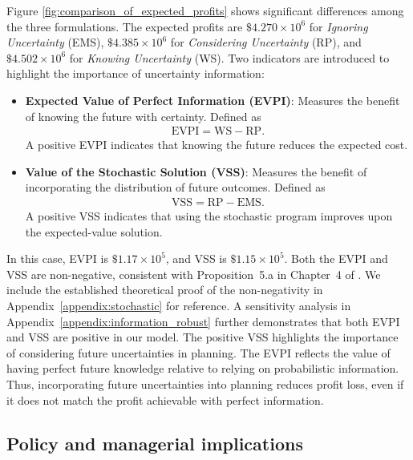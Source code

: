 \documentclass[11pt,english]{article}
\begin{document}
Figure \ref{fig:comparison_of_expected_profits} shows significant differences among the three formulations. The expected profits are $\$4.270 \times 10^6$ for \textit{Ignoring Uncertainty} (EMS), $\$4.385 \times 10^6$ for \textit{Considering Uncertainty} (RP), and $\$4.502 \times 10^6$ for \textit{Knowing Uncertainty} (WS). Two indicators are introduced to highlight the importance of uncertainty information:

\begin{itemize}
    \item \textbf{Expected Value of Perfect Information (EVPI)}: Measures the benefit of knowing the future with certainty. Defined as
    \begin{align}
        \text{EVPI} = \text{WS} - \text{RP}.
    \end{align}
    A positive EVPI indicates that knowing the future reduces the expected cost.

    \item \textbf{Value of the Stochastic Solution (VSS)}: Measures the benefit of incorporating the distribution of future outcomes. Defined as
    \begin{align}
        \text{VSS} = \text{RP} - \text{EMS}.
    \end{align}
    A positive VSS indicates that using the stochastic program improves upon the expected-value solution.
\end{itemize}

In this case, EVPI is $\$1.17 \times 10^5$, and VSS is $\$1.15 \times 10^5$. Both the EVPI and VSS are non-negative, consistent with Proposition~5.a in Chapter~4 of \cite{birge2011introduction}. We include the established theoretical proof of the non-negativity in Appendix~\ref{appendix:stochastic} for reference. A sensitivity analysis in Appendix~\ref{appendix:information_robust} further demonstrates that both EVPI and VSS are positive in our model. The positive VSS highlights the importance of considering future uncertainties in planning. The EVPI reflects the value of having perfect future knowledge relative to relying on probabilistic information. Thus, incorporating future uncertainties into planning reduces profit loss, even if it does not match the profit achievable with perfect information.

\subsection{Policy and managerial implications}
 
\end{document}
